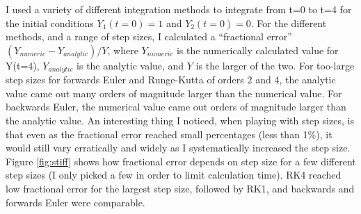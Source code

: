 \documentclass{article}
\begin{document}
I used a variety of different integration methods to integrate
from t=0 to t=4 for the initial conditions $Y_1(t=0)=1$ and
$Y_2(t=0)=0$.  For the different methods, and a range of step sizes,
I calculated a ``fractional error'' $(Y_{numeric}-Y_{analytic})/Y$, where $Y_{numeric}$ is
the numerically calculated value for Y(t=4), $Y_{analytic}$ is the
analytic value, and $Y$ is the larger of the two.  For too-large step sizes for forwards
Euler and Runge-Kutta of orders 2 and 4, the analytic value came out many orders of magnitude
larger than the numerical value.  For backwards Euler, the numerical value came out orders
of magnitude larger than the analytic value.  An interesting thing I noticed, when playing
with step sizes, is that even as the fractional error reached small percentages (less than
1\%), it would still vary erratically and widely as I systematically increased the step size.
Figure \ref{fig:stiff} shows how fractional error depends on step size for a few different
step sizes (I only picked a few in order to limit calculation time).  RK4 reached low fractional
error for the largest step size, followed by RK1, and backwards and forwards Euler were
comparable.
\end{document}
